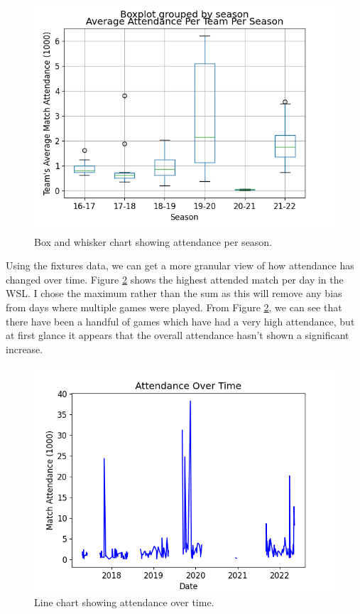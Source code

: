 \documentclass[12pt, a4paper, twocolumn]{article}
\begin{document}
\begin{figure}
  \includegraphics[width=\linewidth]{../vis/tables/attendance_boxwhisker.png}
  \caption{Box and whisker chart showing attendance per season.}
  \label{att_box}
\end{figure}

Using the fixtures data, we can get a more granular view of how attendance has changed over time. Figure \ref{att_ot} shows the highest attended match per day in the WSL. I chose the maximum rather than the sum as this will remove any bias from days where multiple games were played. From Figure \ref{att_ot}, we can see that there have been a handful of games which have had a very high attendance, but at first glance it appears that the overall attendance hasn't shown a significant increase.

\begin{figure}
  \includegraphics[width=\linewidth]{../vis/fixtures/attendance_overtime.png}
  \caption{Line chart showing attendance over time.}
  \label{att_ot}
\end{figure}
\end{document}
